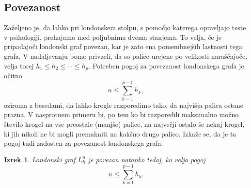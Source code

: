 \documentclass[12pt,a4paper]{amsart}
\theoremstyle{definition} %
\theoremstyle{plain} %
\newtheorem{izrek}[definicija]{Izrek}
\begin{document}
\subsection{Povezanost}

Zaželjeno je, da lahko pri londonskem stolpu, s pomočjo katerega opravljajo teste v psihologiji, prehajamo med poljubnima dvema stanjema. To velja, če je pripadajoči londonski graf povezan, kar je zato ena pomembnejših lastnosti tega grafa.
V nadaljevanju bomo privzeli, da so palice urejene po velikosti naraščajoče, velja torej $h_1 \leq h_2 \leq \cdots \leq h_p$.
Potreben pogoj za povezanost londonskega grafa je očitno 
\[ n \leq \sum_{k=1}^{p-1} h_k, \]
oziroma z besedami, da lahko krogle razporedimo tako, da najvišja palica ostane prazna. V nasprotnem primeru bi, po tem ko bi razporedili maksimalno možno število krogel na vse preostale (manjše) palice, na največji ostalo še nekaj krogel, ki jih nikoli ne bi mogli premakniti na kakšno drugo palico.
Izkaže se, da je ta pogoj tudi zadosten za povezanost londonskega grafa.

\begin{izrek}
    Londonski graf $L_h^n$ je povezan natanko tedaj, ko velja pogoj
    \begin{equation}
        n \leq \sum_{k=1}^{p-1} h_k.
        \label{eq:pogoj-povezanosti}
    \end{equation}
\end{izrek}
\end{document}
